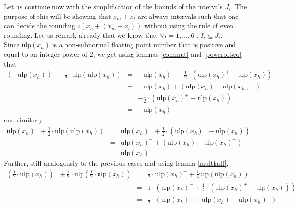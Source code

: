 \documentclass[a4paper,10pt,twoside]{article}
\newenvironment{proof}[1][Proof]{\begin{trivlist}
\item[\hskip \labelsep {\bfseries #1}]}{\end{trivlist}}
\newcommand{\hi}{\ensuremath{\mathit{h}}}
\newcommand{\mi}{\ensuremath{\mathit{m}}}
\newcommand{\lo}{\ensuremath{\mathit{l}}}
\newcommand{\mUlp}{\ensuremath{\mathrm{ulp}}}
\begin{document}
\begin{proof}
Let us continue now with the simplification of the bounds of the intervals $J_i$. The purpose of this
will be showing that $x_\mi + x_\lo$ are always intervals such that one can decide the rounding
$\circ \left( x_\hi + \left( x_\mi + x_\lo \right) \right)$
without using the rule of even rounding. Let us remark already that we know that $\forall i=1,\dots,6 \mbox{ . } I_i \subseteq J_i$.\\
Since $\mUlp\left( x_\hi \right)$ is a non-subnormal floating point number that is positive and equal to an integer power
of $2$, we get using lemmas \ref{commut} and \ref{poweroftwo} that
\begin{eqnarray*}
\left( - \mUlp\left( x_\hi \right)  \right)^- - \frac{1}{2} \cdot \mUlp\left(  \mUlp\left( x_\hi \right)  \right) & = &
- \mUlp\left( x_\hi \right)^- - \frac{1}{2} \cdot \left(  \mUlp\left( x_\hi \right)^+ -  \mUlp\left( x_\hi \right)  \right) \\
& = & - \mUlp\left( x_\hi \right)  + \left(  \mUlp\left( x_\hi \right)  - \mUlp\left( x_\hi \right)^- \right) \\ & & -
\frac{1}{2} \cdot \left(  \mUlp\left( x_\hi \right)^+ -  \mUlp\left( x_\hi \right)  \right) \\
& = & - \mUlp\left( x_\hi \right)
\end{eqnarray*}
and similarly
\begin{eqnarray*}
 \mUlp\left( x_\hi \right)^- + \frac{1}{2} \cdot \mUlp\left(  \mUlp\left( x_\hi \right)  \right) & = &
\mUlp\left( x_\hi \right)^- + \frac{1}{2} \cdot \left(  \mUlp\left( x_\hi \right)^+ -  \mUlp\left( x_\hi \right)  \right) \\
& = &  \mUlp\left( x_\hi \right)^- + \left(  \mUlp\left( x_\hi \right)  -  \mUlp\left( x_\hi \right)^- \right) \\
& = &  \mUlp\left( x_\hi \right)
\end{eqnarray*}
Further, still analogously to the previous cases and using lemma \ref{multhalf},
\begin{eqnarray*}
\left( \frac{1}{2} \cdot  \mUlp\left( x_\hi \right)  \right)^- + \frac{1}{2} \cdot \mUlp\left( \frac{1}{2} \cdot  \mUlp\left( x_\hi \right)  \right)
& = &
\frac{1}{2} \cdot  \mUlp\left( x_\hi \right)^- + \frac{1}{4} \mUlp\left(  \mUlp\left( x_\hi \right)  \right) \\
& = & \frac{1}{2} \cdot \left(  \mUlp\left( x_\hi \right)^- + \frac{1}{2} \cdot \left(  \mUlp\left( x_\hi \right)^+
-  \mUlp\left( x_\hi \right)  \right) \right) \\
& = & \frac{1}{2} \cdot \left(  \mUlp\left( x_\hi \right)^- +  \mUlp\left( x_\hi \right)  -  \mUlp\left( x_\hi \right)^- \right) \\

\end{eqnarray*}
\end{proof}
\end{document}
